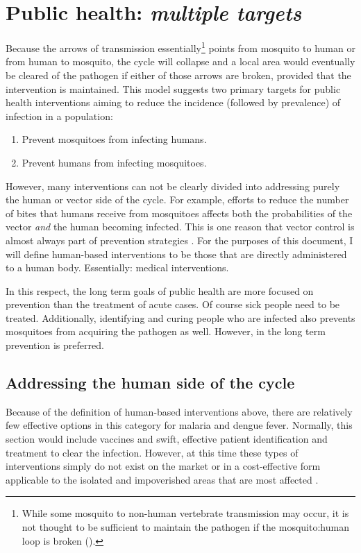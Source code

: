 \section{Public health: \emph{multiple targets}}

Because the arrows of transmission essentially\footnote{While some mosquito
  to non-human vertebrate transmission may occur, it is not thought to
  be sufficient to maintain the pathogen if the mosquito:human loop is
  broken (\CITEME).}
points from mosquito to human or from human to mosquito, the cycle will collapse and a local area would eventually be cleared of the pathogen if either of those arrows are broken, provided that the intervention is maintained.
This model suggests two primary targets for public health interventions aiming to reduce the \gls{incidence}
(followed by \gls{prevalence}) of infection in a population:

\begin{enumerate}
\item Prevent mosquitoes from infecting humans.
\item Prevent humans from infecting mosquitoes.
\end{enumerate}

However, many interventions can not be clearly divided into addressing purely the human or vector side of the cycle.
For example, efforts to reduce the number of bites that humans receive from mosquitoes affects both the probabilities of the vector \emph{and} the human becoming infected.
This is one reason that vector control is almost always part of prevention strategies \CITEME.
For the purposes of this document, I will define human-based interventions to be those that are directly administered to a human body.
Essentially: medical interventions.

In this respect, the long term goals of public health are more focused on prevention than the treatment of acute cases.
Of course sick people need to be treated. Additionally, identifying and curing people who are infected also prevents mosquitoes from acquiring the pathogen as well.
However, in the long term prevention is preferred.


\subsection{Addressing the human side of the cycle}

Because of the definition of human-based interventions above, there are relatively few effective options in this category for malaria and dengue fever.
Normally, this section would include vaccines and swift, effective patient identification and treatment to clear the infection.
However, at this time these types of interventions simply do not exist on the market or in a cost-effective form applicable to the isolated and impoverished areas that are most affected \CITEME.


